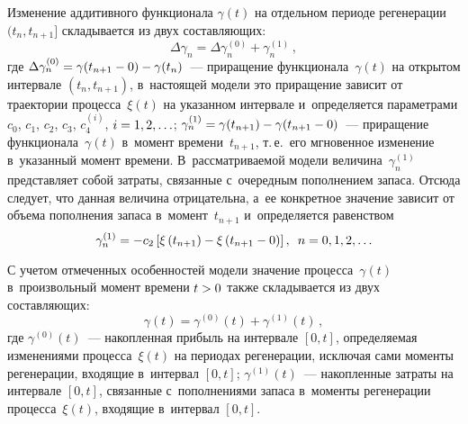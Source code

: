 \begin{multicols}{2}
  Изменение аддитивного функционала $\gamma(t)$ на отдельном периоде 
регенерации $(t_n, t_{n+1}]$ складывается из двух со\-став\-ля\-ющих:
  \begin{equation}
  \Delta \gamma_n=\Delta \gamma_n^{(0)}+\gamma_n^{(1)}\,,
  \label{e2-sk}
  \end{equation}
где $\Delta \gamma_n^{(0)}\hm= \gamma(t_{n+1}-0)\hm- \gamma(t_n)$~--- 
приращение функционала~$\gamma(t)$ на открытом интервале $(t_n, t_{n+1})$,\linebreak 
в~на\-сто\-ящей модели это приращение зависит от траектории процесса~$\xi(t)$ 
на указанном интервале и~определяется па\-ра\-мет\-ра\-ми $c_0$, $c_1$, $c_2$, 
$c_3$, $c_4^{(i)}$, $i\hm= 1,2,\ldots$; $\gamma_n^{(1)}\hm= 
\gamma(t_{n+1})\hm- \gamma(t_{n+1}\hm-0)$~--- приращение 
функционала~$\gamma(t)$ в~момент времени~$t_{n+1}$, т.\,е.\ его мгновенное 
изменение в~указанный момент времени. В~рас\-смат\-ри\-ва\-емой модели 
величина~$\gamma_n^{(1)}$ пред\-став\-ля\-ет собой затраты, связанные 
с~очередным пополнением запаса. Отсюда следует, что данная величина 
отрицательна, а~ее конкретное значение зависит от объема пополнения запаса 
в~момент~$t_{n+1}$ и~определяется равенством 
$$
\gamma_n^{(1)}= -
c_2\left[\xi\left(t_{n+1}\right)- \xi\left( t_{n+1} -0\right)\right],\enskip
 n\hm= 0,1,2,\ldots
 $$

С учетом отмеченных особенностей модели значение процесса~$\gamma(t)$ 
в~произвольный момент времени $t\hm>0$ также складывается из двух 
со\-став\-ля\-ющих:
\begin{equation}
\gamma(t)=\gamma^{(0)}(t)+\gamma^{(1)}(t)\,,
\label{e3-sk}
\end{equation}
где $\gamma^{(0)}(t)$~--- накопленная прибыль на интервале $[0,t]$, 
определяемая изменениями процесса~$\xi(t)$ на периодах регенерации, 
исключая сами моменты регенерации, входящие в~интервал $[0, t]$; 
$\gamma^{(1)}(t)$~--- накопленные за\-тра\-ты на интервале $[0,t]$, связанные 
с~пополнениями запаса в~моменты регенерации процесса~$\xi(t)$, входящие 
в~интервал $[0,t]$. 
  

\end{multicols}
